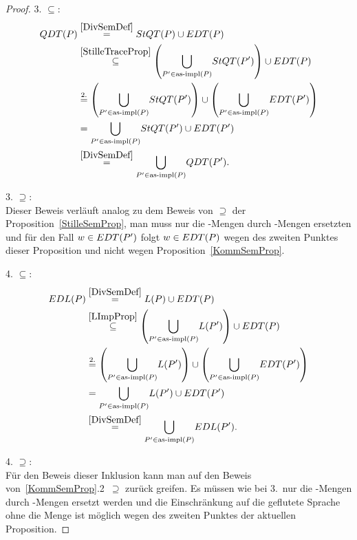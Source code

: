 \begin{proof}
  3. \glqq$\subseteq$\grqq{}:
  {\allowdisplaybreaks
  \begin{align*}
    QDT (P)&\overset{\ref{DivSemDef}}{=} StQT (P)\cup EDT (P)\\
    &\overset{\ref{StilleTraceProp}}{\subseteq} \left(\underset{P'\in \mathrm{as}\text{-}\mathrm{impl}
    (P)}{\bigcup} StQT (P')\right)\cup EDT (P)\\
    &\overset{2.}{=} \left(\underset{P'\in \mathrm{as}\text{-}\mathrm{impl} (P)}{\bigcup} StQT
    (P')\right)\cup \left(\underset{P'\in \mathrm{as}\text{-}\mathrm{impl} (P)}{\bigcup} EDT
    (P')\right)\\
    &= \underset{P'\in \mathrm{as}\text{-}\mathrm{impl} (P)}{\bigcup} StQT (P') \cup EDT (P')\\
    &\overset{\ref{DivSemDef}}{=} \underset{P'\in\mathrm{as}\text{-}\mathrm{impl} (P)}{\bigcup} QDT
    (P').
  \end{align*}}

  3. \glqq$\supseteq$\grqq{}:\\
  Dieser Beweis verläuft analog zu dem Beweis von \glqq$\supseteq$\grqq{} der
  Proposition~\ref{StilleSemProp}, man muss nur die \ET{}-Mengen durch
  \EDT{}-Mengen ersetzten und für den Fall $w\in EDT (P')$ folgt $w\in EDT (P)$
  wegen des zweiten Punktes dieser Proposition und nicht wegen
  Proposition~\ref{KommSemProp}.

  4. \glqq$\subseteq$\grqq{}:
  {\allowdisplaybreaks
  \begin{align*}
    EDL (P)&\overset{\ref{DivSemDef}}{=} L (P)\cup EDT (P)\\
    &\overset{\ref{LImpProp}}{\subseteq} \left(\underset{P'\in \mathrm{as}\text{-}\mathrm{impl}
    (P)}{\bigcup} L (P')\right) \cup EDT (P)\\
    &\overset{2.}{=} \left(\underset{P'\in \mathrm{as}\text{-}\mathrm{impl} (P)}{\bigcup} L (P')\right)
    \cup \left(\underset{P'\in \mathrm{as}\text{-}\mathrm{impl} (P)}{\bigcup} EDT (P')\right)\\
    &= \underset{P'\in \mathrm{as}\text{-}\mathrm{impl} (P)}{\bigcup} L (P') \cup EDT (P')\\
    &\overset{\ref{DivSemDef}}{=} \underset{P'\in\mathrm{as}\text{-}\mathrm{impl} (P)}{\bigcup} EDL
    (P').
  \end{align*}}

  4. \glqq$\supseteq$\grqq{}:\\
  Für den Beweis dieser Inklusion kann man auf den Beweis
  von~\ref{KommSemProp}.2~\glqq$\supseteq$\grqq{} zurück greifen. Es müssen
  wie bei 3.\ nur die \ET{}-Mengen durch \EDT{}-Mengen ersetzt werden und die
  Einschränkung auf die geflutete Sprache ohne die Menge \EDT{} ist möglich
  wegen des zweiten Punktes der aktuellen Proposition.
\end{proof}

